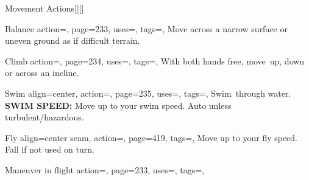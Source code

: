 \begin{PageBack}
\begin{Tables}{\backTableHeight}
\begin{Table}{Movement Actions}[][]
\begin{entry}{Balance}{%
                action=,
                page=233,
                uses=\Acrobatics,
                tags=\Move,
            }
                Move across a narrow surface or uneven ground as if difficult terrain.\hfill {}\quad {}
            \end{entry}
            \begin{entry}{Climb}{%
                action=,
                page=234,
                uses=\Athletics,
                tags=\Move,
            }
                With both hands free, move \,\Feet up, down or across an incline.\hfill {}
            \end{entry}
            \begin{entry}{Swim}{%
                align=center,
                action=,
                page=235,
                uses=\Athletics,
                tags=\Move,
            }
                Swim \,\Feet through water.  \hfill { \hfill {}\hfill }\\%
                 \hfill \textbf{SWIM SPEED:} Move up to your swim
                speed. Auto
                 unless turbulent/hazardous.
            \end{entry}
            \breakLine
            \begin{entry}{Fly}{%
                align=center seam,
                action=,
                page=419,
                tags=\Move,
            }
                Move up to your fly speed. Fall if not used on turn. \hfill
            \end{entry}
            \begin{entry}{Maneuver in flight}{%
                action=,
                page=233,
                uses={\Acrobatics[tags={T}]},
                tags=\Move,
            }

\end{entry}
\end{Table}
\end{Tables}
\end{PageBack}
